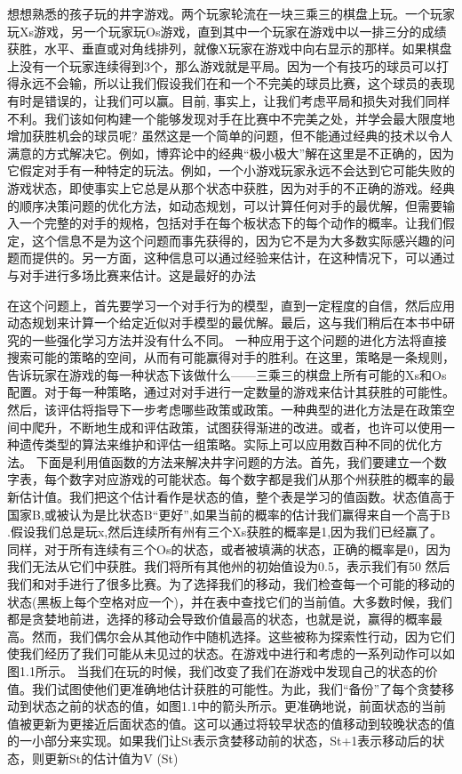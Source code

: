 想想熟悉的孩子玩的井字游戏。两个玩家轮流在一块三乘三的棋盘上玩。一个玩家玩Xs游戏，另一个玩家玩Os游戏，直到其中一个玩家在游戏中以一排三分的成绩获胜，水平、垂直或对角线排列，就像X玩家在游戏中向右显示的那样。如果棋盘上没有一个玩家连续得到3个，那么游戏就是平局。因为一个有技巧的球员可以打得永远不会输，所以让我们假设我们在和一个不完美的球员比赛，这个球员的表现有时是错误的，让我们可以赢。目前,
事实上，让我们考虑平局和损失对我们同样不利。我们该如何构建一个能够发现对手在比赛中不完美之处，并学会最大限度地增加获胜机会的球员呢?
虽然这是一个简单的问题，但不能通过经典的技术以令人满意的方式解决它。例如，博弈论中的经典“极小极大”解在这里是不正确的，因为它假定对手有一种特定的玩法。例如，一个小游戏玩家永远不会达到它可能失败的游戏状态，即使事实上它总是从那个状态中获胜，因为对手的不正确的游戏。经典的顺序决策问题的优化方法，如动态规划，可以计算任何对手的最优解，但需要输入一个完整的对手的规格，包括对手在每个板状态下的每个动作的概率。让我们假定，这个信息不是为这个问题而事先获得的，因为它不是为大多数实际感兴趣的问题而提供的。另一方面，这种信息可以通过经验来估计，在这种情况下，可以通过与对手进行多场比赛来估计。这是最好的办法

在这个问题上，首先要学习一个对手行为的模型，直到一定程度的自信，然后应用动态规划来计算一个给定近似对手模型的最优解。最后，这与我们稍后在本书中研究的一些强化学习方法并没有什么不同。
一种应用于这个问题的进化方法将直接搜索可能的策略的空间，从而有可能赢得对手的胜利。在这里，策略是一条规则，告诉玩家在游戏的每一种状态下该做什么——三乘三的棋盘上所有可能的Xs和Os配置。对于每一种策略，通过对对手进行一定数量的游戏来估计其获胜的可能性。然后，该评估将指导下一步考虑哪些政策或政策。一种典型的进化方法是在政策空间中爬升，不断地生成和评估政策，试图获得渐进的改进。或者，也许可以使用一种遗传类型的算法来维护和评估一组策略。实际上可以应用数百种不同的优化方法。
下面是利用值函数的方法来解决井字问题的方法。首先，我们要建立一个数字表，每个数字对应游戏的可能状态。每个数字都是我们从那个州获胜的概率的最新估计值。我们把这个估计看作是状态的值，整个表是学习的值函数。状态值高于国家B,或被认为是比状态B“更好”,如果当前的概率的估计我们赢得来自一个高于B .假设我们总是玩x,然后连续所有州有三个Xs获胜的概率是1,因为我们已经赢了。同样，对于所有连续有三个Os的状态，或者被填满的状态，正确的概率是0，因为我们无法从它们中获胜。我们将所有其他州的初始值设为0.5，表示我们有50%
然后我们和对手进行了很多比赛。为了选择我们的移动，我们检查每一个可能的移动的状态(黑板上每个空格对应一个)，并在表中查找它们的当前值。大多数时候，我们都是贪婪地前进，选择的移动会导致价值最高的状态，也就是说，赢得的概率最高。然而，我们偶尔会从其他动作中随机选择。这些被称为探索性行动，因为它们使我们经历了我们可能从未见过的状态。在游戏中进行和考虑的一系列动作可以如图1.1所示。
当我们在玩的时候，我们改变了我们在游戏中发现自己的状态的价值。我们试图使他们更准确地估计获胜的可能性。为此，我们“备份”了每个贪婪移动到状态之前的状态的值，如图1.1中的箭头所示。更准确地说，前面状态的当前值被更新为更接近后面状态的值。这可以通过将较早状态的值移动到较晚状态的值的一小部分来实现。如果我们让St表示贪婪移动前的状态，St+1表示移动后的状态，则更新St的估计值为V (St)

